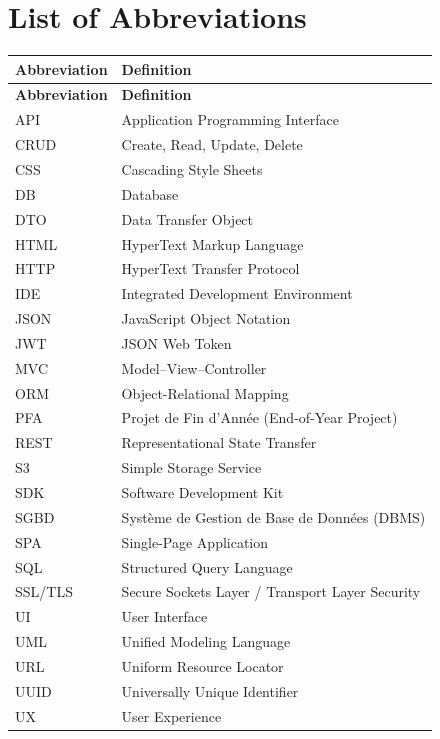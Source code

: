 \chapter*{List of Abbreviations}

\begin{longtable}{@{} l p{12cm} @{}}
\toprule
\textbf{Abbreviation} & \textbf{Definition} \\
\midrule
\endfirsthead
\toprule
\textbf{Abbreviation} & \textbf{Definition} \\
\midrule
\endhead
\bottomrule
\endfoot
API     & Application Programming Interface \\
CRUD    & Create, Read, Update, Delete \\
CSS     & Cascading Style Sheets \\
DB      & Database \\
DTO     & Data Transfer Object \\
HTML    & HyperText Markup Language \\
HTTP    & HyperText Transfer Protocol \\
IDE     & Integrated Development Environment \\
JSON    & JavaScript Object Notation \\
JWT     & JSON Web Token \\
MVC     & Model--View--Controller \\
ORM     & Object-Relational Mapping \\
PFA     & Projet de Fin d'Année (End-of-Year Project) \\
REST    & Representational State Transfer \\
S3      & Simple Storage Service \\
SDK     & Software Development Kit \\
SGBD    & Système de Gestion de Base de Données (DBMS) \\
SPA     & Single-Page Application \\
SQL     & Structured Query Language \\
SSL/TLS & Secure Sockets Layer / Transport Layer Security \\
UI      & User Interface \\
UML     & Unified Modeling Language \\
URL     & Uniform Resource Locator \\
UUID    & Universally Unique Identifier \\
UX      & User Experience \\
\end{longtable}

